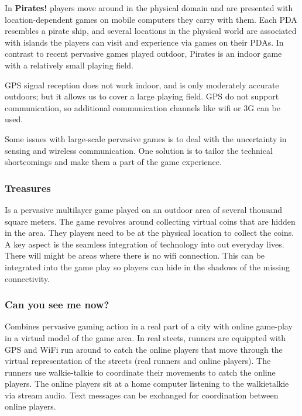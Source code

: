     In {\bf Pirates!} players move around in the physical domain and are presented with location-dependent games on mobile computers they carry with them. Each PDA resembles a pirate ship, and several locations in the physical world are associated with islands the players can visit and experience via games on their PDAs. In contrast to recent pervasive games played outdoor, Pirates is an indoor game with a relatively small playing field. 

    GPS signal reception does not work indoor, and is only moderately accurate outdoors; but it allows us to cover a large playing field. GPS do not support communication, so additional communication channels like wifi or 3G can be used. 

    Some issues with large-scale pervasive games is to deal with the uncertainty in sensing and wireless communication. One solution is to tailor the technical shortcomings and make them a part of the game experience. 

      \subsubsection*{Treasures} 
      Is a pervasive multilayer game played on an outdoor area of several thousand square meters. The game revolves around collecting virtual coins that are hidden in the area. They players need to be at the physical location to collect the coins. A key aspect is the seamless integration of technology into out everyday lives. 
      There will might be areas where there is no wifi connection. This can be integrated into the game play so players can hide in the shadows of the missing connectivity. 

      \subsubsection*{Can you see me now?}
      Combines pervasive gaming action in a real part of a city with online game-play in a virtual model of the game area. In real steets, runners are equippted with GPS and WiFi run around to catch the online players that move through the virtual representation of the streets (real runners and online players). The runners use walkie-talkie to coordinate their movements to catch the online players. The online players sit at a home computer listening to the walkietalkie via stream audio. Text messages can be exchanged for coordination between online players. 

